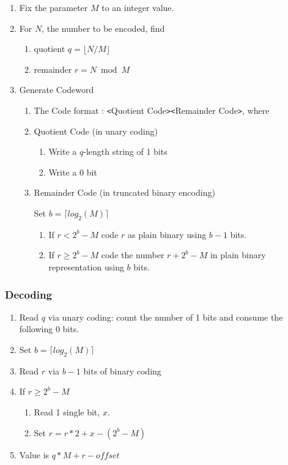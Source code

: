 \documentclass[a4paper]{article}
\begin{document}
\begin{enumerate}
\item Fix the parameter $M$ to an integer value.

\item For $N$, the number to be encoded, find

\begin{enumerate}
\item quotient $q = \lfloor N/M \rfloor$

\item remainder $r = N \bmod M$
\end{enumerate}

\item Generate Codeword

\begin{enumerate}
\item The Code format : \texttt{<}Quotient Code\texttt{>}\texttt{<}Remainder Code\texttt{>}, 
where

\item Quotient Code (in unary coding)

\begin{enumerate}
\item Write a $q$-length string of 1 bits

\item Write a 0 bit
\end{enumerate}

\item Remainder Code (in truncated binary encoding)

Set $b=\lceil log_{2}(M) \rceil$

\begin{enumerate}
\item If $r < 2^{b}-M$ code $r$ as plain binary using $b-1$ bits.

\item If $r \ge 2^{b}-M$ code the number $r+2^{b}-M$ in plain binary representation 
using $b$ bits.
\end{enumerate}
\end{enumerate}
\end{enumerate}

\subsubsection*{Decoding}

\begin{enumerate}
\item Read $q$ via unary coding: count the number of 1 bits and consume the following 0 bits.
\item Set $b=\lceil log_{2}(M) \rceil$
\item Read $r$ via $b-1$ bits of binary coding
\item If $r \ge 2^{b}-M$
\begin{enumerate}
\item Read 1 single bit, $x$.
\item Set $r = r*2 + x - (2^{b}-M)$
\end{enumerate}
\item Value is $q*M + r - \mathit{offset}$
\end{enumerate}
\end{document}
